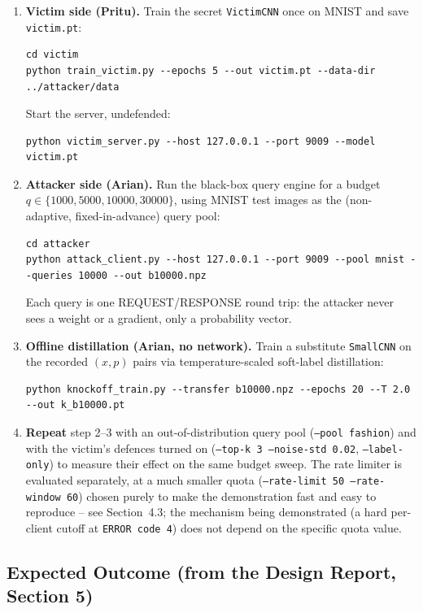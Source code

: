 \documentclass[11pt]{article}
\begin{document}
\begin{enumerate}
\item \textbf{Victim side (Pritu).} Train the secret \texttt{VictimCNN} once on MNIST
  and save \texttt{victim.pt}:
\begin{lstlisting}
cd victim
python train_victim.py --epochs 5 --out victim.pt --data-dir ../attacker/data
\end{lstlisting}
  Start the server, undefended:
\begin{lstlisting}
python victim_server.py --host 127.0.0.1 --port 9009 --model victim.pt
\end{lstlisting}

\item \textbf{Attacker side (Arian).} Run the black-box query engine for a budget
  $q \in \{1000, 5000, 10000, 30000\}$, using MNIST test images as the
  (non-adaptive, fixed-in-advance) query pool:
\begin{lstlisting}
cd attacker
python attack_client.py --host 127.0.0.1 --port 9009 --pool mnist --queries 10000 --out b10000.npz
\end{lstlisting}
  Each query is one REQUEST/RESPONSE round trip: the attacker never sees a
  weight or a gradient, only a probability vector.

\item \textbf{Offline distillation (Arian, no network).} Train a substitute
  \texttt{SmallCNN} on the recorded $(x, p)$ pairs via temperature-scaled
  soft-label distillation:
\begin{lstlisting}
python knockoff_train.py --transfer b10000.npz --epochs 20 --T 2.0 --out k_b10000.pt
\end{lstlisting}

\item \textbf{Repeat} step 2--3 with an out-of-distribution query pool
  (\texttt{--pool fashion}) and with the victim's defences turned on
  (\texttt{--top-k 3 --noise-std 0.02}, \texttt{--label-only}) to measure
  their effect on the same budget sweep. The rate limiter is evaluated
  separately, at a much smaller quota (\texttt{--rate-limit 50
  --rate-window 60}) chosen purely to make the demonstration fast and easy
  to reproduce -- see Section~4.3; the mechanism being demonstrated (a hard
  per-client cutoff at \texttt{ERROR code 4}) does not depend on the
  specific quota value.
\end{enumerate}

\subsection{Expected Outcome (from the Design Report, Section 5)}
\end{document}
